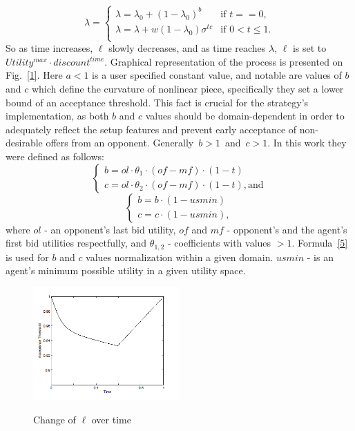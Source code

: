 \documentclass[html]{report}    %
\begin{document}
\begin{equation} \label{3}
	\lambda =	\begin{cases}
	   		  	\lambda = \lambda_0 + (1-\lambda_0)^b &  \mbox{if } t==0,\\
	       		 \lambda = \lambda + w(1-\lambda_0)\sigma^{tc} & \mbox{if } 0<t\leq1.\\
				\end{cases}
\end{equation}
So as time increases, $\ell$ slowly decreases, and as time reaches $\lambda$, $\ell$ is set to \( Utility^{max}\cdot discount^{time}  \). Graphical representation of the process is presented on Fig.~\ref{1}. Here $a<1$ is a user specified constant value, and notable are values of $b$ and $c$ which define the curvature of nonlinear piece, specifically they set a lower bound of an acceptance threshold. This fact is crucial for the strategy's implementation, as both $b$ and $c$ values should be domain-dependent in order to adequately reflect the setup features and prevent early acceptance of non-desirable offers from an opponent. Generally~$b>1$~and~$c>1$. In this work they were defined as follows:
\begin{dmath} \label{4}	
	\begin{cases}
		b = ol \cdot \theta_1\cdot (of - mf) \cdot (1 - t) \\
		c = ol \cdot \theta_2\cdot (of - mf) \cdot (1 - t), \text{and}
	\end{cases}
\end{dmath}
\begin{dmath} \label{5}	
	\begin{cases}
		b = b\cdot(1 - usmin) \\
		c = c\cdot(1 - usmin),
	\end{cases}
\end{dmath}
where $ol$ - an opponent's last bid utility, $of$ and $mf$ - opponent's and the agent's first bid utilities respectfully, and $\theta_{1,2}$ - coefficients with values $>1$. Formula~\ref{5} is used for $b$ and $c$ values normalization within a given domain. $usmin$ - is an agent's minimum possible utility in a given utility space.

\begin{figure}[htbp]
	\caption{Change of $\ell$ over time}
	\centering
	\includegraphics[width=0.5\textwidth]{ell}
	\label{2}
\end{figure}
\end{document}
